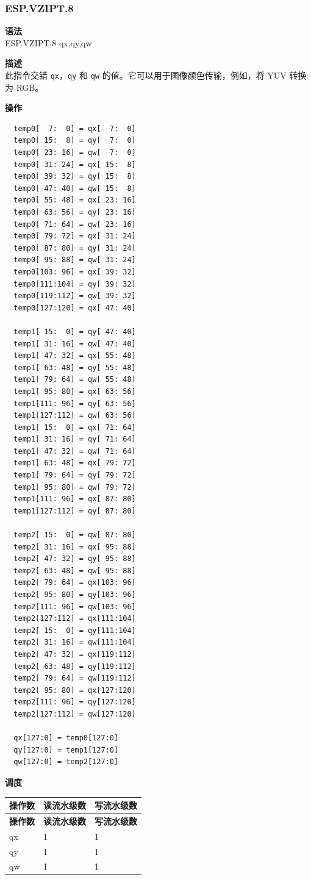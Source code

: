 \newpage

\newpage
\subsubsection{ESP.VZIPT.8}\label{instruction:ESPVZIPT8}
\textbf{语法}\\
ESP.VZIPT.8 qx,qy,qw

\textbf{描述}\\
此指令交错 \lstinline{qx}，\lstinline{qy} 和 \lstinline{qw} 的值。它可以用于图像颜色传输，例如，将 YUV 转换为 RGB。

\textbf{操作}\\
\begin{lstlisting}
  temp0[  7:  0] = qx[  7:  0]
  temp0[ 15:  8] = qy[  7:  0]
  temp0[ 23: 16] = qw[  7:  0]
  temp0[ 31: 24] = qx[ 15:  8]
  temp0[ 39: 32] = qy[ 15:  8]
  temp0[ 47: 40] = qw[ 15:  8]
  temp0[ 55: 48] = qx[ 23: 16]
  temp0[ 63: 56] = qy[ 23: 16]
  temp0[ 71: 64] = qw[ 23: 16]
  temp0[ 79: 72] = qx[ 31: 24]
  temp0[ 87: 80] = qy[ 31: 24]
  temp0[ 95: 88] = qw[ 31: 24]
  temp0[103: 96] = qx[ 39: 32]
  temp0[111:104] = qy[ 39: 32]
  temp0[119:112] = qw[ 39: 32]
  temp0[127:120] = qx[ 47: 40]

  temp1[ 15:  0] = qy[ 47: 40]
  temp1[ 31: 16] = qw[ 47: 40]
  temp1[ 47: 32] = qx[ 55: 48]
  temp1[ 63: 48] = qy[ 55: 48]
  temp1[ 79: 64] = qw[ 55: 48]
  temp1[ 95: 80] = qx[ 63: 56]
  temp1[111: 96] = qy[ 63: 56]
  temp1[127:112] = qw[ 63: 56]
  temp1[ 15:  0] = qx[ 71: 64]
  temp1[ 31: 16] = qy[ 71: 64]
  temp1[ 47: 32] = qw[ 71: 64]
  temp1[ 63: 48] = qx[ 79: 72]
  temp1[ 79: 64] = qy[ 79: 72]
  temp1[ 95: 80] = qw[ 79: 72]
  temp1[111: 96] = qx[ 87: 80]
  temp1[127:112] = qy[ 87: 80]

  temp2[ 15:  0] = qw[ 87: 80]
  temp2[ 31: 16] = qx[ 95: 88]
  temp2[ 47: 32] = qy[ 95: 88]
  temp2[ 63: 48] = qw[ 95: 88]
  temp2[ 79: 64] = qx[103: 96]
  temp2[ 95: 80] = qy[103: 96]
  temp2[111: 96] = qw[103: 96]
  temp2[127:112] = qx[111:104]
  temp2[ 15:  0] = qy[111:104]
  temp2[ 31: 16] = qw[111:104]
  temp2[ 47: 32] = qx[119:112]
  temp2[ 63: 48] = qy[119:112]
  temp2[ 79: 64] = qw[119:112]
  temp2[ 95: 80] = qx[127:120]
  temp2[111: 96] = qy[127:120]
  temp2[127:112] = qw[127:120]

  qx[127:0] = temp0[127:0]
  qy[127:0] = temp1[127:0]
  qw[127:0] = temp2[127:0]
\end{lstlisting}

\textbf{调度}\\
\begin{longtable}[c]{|l|l|l|}
    \hline
    \rowcolor{lightgray}
    \textbf{操作数} & \textbf{读流水级数} & \textbf{写流水级数} \\\hline
    \endfirsthead
    \hline
    \rowcolor{lightgray}
     \textbf{操作数} & \textbf{读流水级数} & \textbf{写流水级数} \\\hline
    \endhead
    \hline
    \endfoot

  qx & 1 & 1 \\\hline
  qy & 1 & 1 \\\hline
  qw & 1 & 1

\end{longtable}

